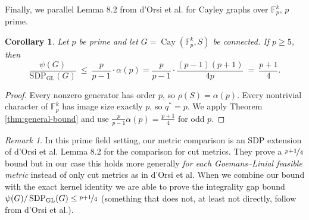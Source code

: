 \documentclass[11pt]{article}
\newtheorem{corollary}[theorem]{Corollary}
\theoremstyle{definition}
\theoremstyle{remark}
\newtheorem{remark}[theorem]{Remark}
\newcommand{\Cay}{\operatorname{Cay}}
\newcommand{\roundval}{\operatorname{Round}}
\newcommand{\poly}{\operatorname{poly}}
\newcommand{\gl}{\operatorname{SDP_{GL}}}
\begin{document}


Finally, we parallel Lemma 8.2 from d'Orsi et al. \cite{dorsiaetall25} for Cayley graphs over $\mathbb{F}_p^k$, $p$ prime. 


\begin{corollary}\label{cor:prime-exponent}
Let $p$ be prime and let $G=\Cay(\mathbb{F}_p^k,S)$ be connected. If $p\ge5$, then
\begin{equation}\label{eq:prime-bound}
  \frac{\psi(G)}{\gl(G)}
  ~\leq~\frac{p}{p-1} \cdot \alpha(p) 
  = \frac{p}{p-1} \cdot \frac{(p-1)(p+1)}{4p} 
  ~=~ \frac{p+1}{4}.
\end{equation}
\end{corollary}

\begin{proof}
Every nonzero generator has order $p$, so $\rho(S)=\alpha(p)$. Every nontrivial character of $\mathbb{F}_p^k$ has image size exactly $p$, so $q^*=p$. We apply Theorem \ref{thm:general-bound} and use $\frac{p}{p-1} \alpha(p)=\frac{p+1}{4}$ for odd $p$.
\end{proof}

\begin{remark}
In this prime field setting, our metric comparison is an SDP extension of d’Orsi et al. Lemma 8.2  for the comparison for cut metrics. They prove a  $\nicefrac{p+1}{4}$ bound but in our case this holds more generally \emph{for each Goemans–Linial feasible metric} instead of only cut metrics as in d'Orsi et al. When we combine our bound with the exact kernel identity  we are able to prove the integrality gap bound $\psi(G)/\gl(G) \leq \nicefrac{p+1}{4}$ (something that does not, at least not directly, follow from d'Orsi et al.). 
\end{remark}
\end{document}
